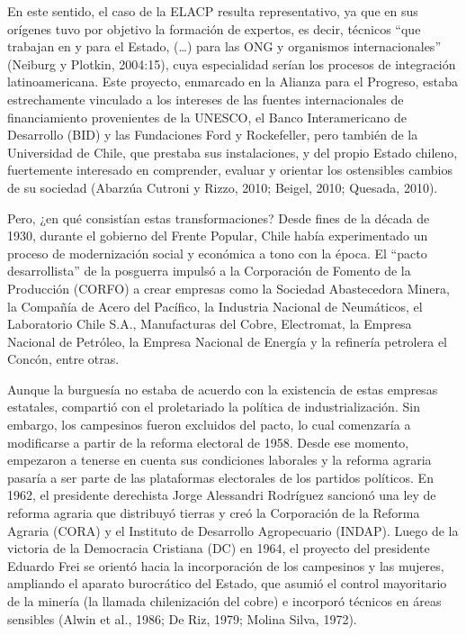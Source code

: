 En este sentido, el caso de la ELACP resulta representativo, ya que en sus orígenes tuvo por objetivo la formación de expertos, es decir, técnicos ``que trabajan en y para el Estado, (\dots) para las ONG y organismos internacionales'' (Neiburg y Plotkin, 2004:15), cuya especialidad serían los procesos de integración latinoamericana. Este proyecto, enmarcado en la Alianza para el Progreso, estaba estrechamente vinculado a los intereses de las fuentes internacionales de financiamiento provenientes de la UNESCO, el Banco Interamericano de Desarrollo (BID) y las Fundaciones Ford y Rockefeller, pero también de la Universidad de Chile, que prestaba sus instalaciones, y del propio Estado chileno, fuertemente interesado en comprender, evaluar y orientar los ostensibles cambios de su sociedad (Abarzúa Cutroni y Rizzo, 2010; Beigel, 2010; Quesada, 2010).

Pero, ¿en qué consistían estas transformaciones? Desde fines de la década de 1930, durante el gobierno del Frente Popular, Chile había experimentado un proceso de modernización social y económica a tono con la época. El ``pacto desarrollista'' de la posguerra impulsó a la Corporación de Fomento de la Producción (CORFO) a crear empresas como la Sociedad Abastecedora Minera, la Compañía de Acero del Pacífico, la Industria Nacional de Neumáticos, el Laboratorio Chile S.A., Manufacturas del Cobre, Electromat, la Empresa Nacional de Petróleo, la Empresa Nacional de Energía y la refinería petrolera el Concón, entre otras.

Aunque la burguesía no estaba de acuerdo con la existencia de estas empresas estatales, compartió con el proletariado la política de industrialización. Sin embargo, los campesinos fueron excluidos del pacto, lo cual comenzaría a modificarse a partir de la reforma electoral de 1958. Desde ese momento, empezaron a tenerse en cuenta sus condiciones laborales y la reforma agraria pasaría a ser parte de las plataformas electorales de los partidos políticos. En 1962, el presidente derechista Jorge Alessandri Rodríguez sancionó una ley de reforma agraria que distribuyó tierras y creó la Corporación de la Reforma Agraria (CORA) y el Instituto de Desarrollo Agropecuario (INDAP). Luego de la victoria de la Democracia Cristiana (DC) en 1964, el proyecto del presidente Eduardo Frei se orientó hacia la incorporación de los campesinos y las mujeres, ampliando el aparato burocrático del Estado, que asumió el control mayoritario de la minería (la llamada chilenización del cobre) e incorporó técnicos en áreas sensibles (Alwin et al., 1986; De Riz, 1979; Molina Silva, 1972).

